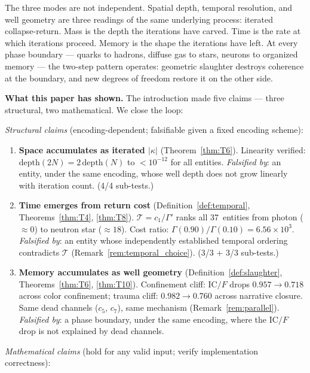 \documentclass[
  aps,
  prd,
  twocolumn,
  superscriptaddress,
  nofootinbib,
  floatfix
]{revtex4-2}
\newcommand{\Gam}{\Gamma}
\newcommand{\IC}{\mathrm{IC}}
\begin{document}
The three modes are not independent.  Spatial depth,
temporal resolution, and well geometry are three readings of
the same underlying process: iterated collapse-return.  Mass
is the depth the iterations have carved.  Time is the rate at
which iterations proceed.  Memory is the shape the iterations
have left.  At every phase boundary --- quarks to hadrons,
diffuse gas to stars, neurons to organized memory --- the
two-step pattern operates: geometric slaughter destroys
coherence at the boundary, and new degrees of freedom
restore it on the other side.

\textbf{What this paper has shown.}
The introduction made five claims --- three structural, two
mathematical.  We close the loop:

\emph{Structural claims} (encoding-dependent; falsifiable
given a fixed encoding scheme):

\begin{enumerate}
\item \textbf{Space accumulates as iterated $|\kappa|$}
  (Theorem~\ref{thm:T6}).
  Linearity verified: $\mathrm{depth}(2N) = 2\,\mathrm{depth}(N)$
  to $< 10^{-12}$ for all entities.
  \emph{Falsified by}: an entity, under the same encoding,
  whose well depth does not grow linearly with iteration
  count.  (4/4 sub-tests.)

\item \textbf{Time emerges from return cost}
  (Definition~\ref{def:temporal}, Theorems~\ref{thm:T4},
  \ref{thm:T8}).
  $\mathcal{T} = c_1/\Gam'$ ranks all 37~entities from
  photon ($\approx 0$) to neutron star ($\approx 18$).
  Cost ratio: $\Gam(0.90)/\Gam(0.10) = 6.56 \times 10^{3}$.
  \emph{Falsified by}: an entity whose independently
  established temporal ordering contradicts $\mathcal{T}$
  (Remark~\ref{rem:temporal_choice}).
  (3/3 + 3/3 sub-tests.)

\item \textbf{Memory accumulates as well geometry}
  (Definition~\ref{def:slaughter},
  Theorems~\ref{thm:T6}, \ref{thm:T10}).
  Confinement cliff: $\IC/F$ drops $0.957 \to 0.718$ across
  color confinement; trauma cliff: $0.982 \to 0.760$ across
  narrative closure.  Same dead channels ($c_5$, $c_7$), same
  mechanism (Remark~\ref{rem:parallel}).
  \emph{Falsified by}: a phase boundary, under the same
  encoding, where the $\IC/F$ drop is not explained by dead
  channels.
\end{enumerate}

\emph{Mathematical claims} (hold for any valid input;
verify implementation correctness):
\end{document}
